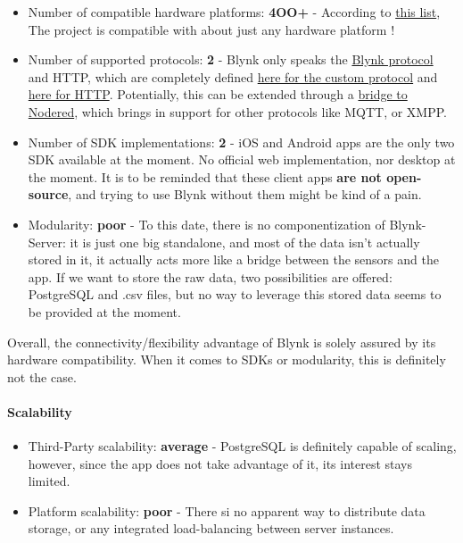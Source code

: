 \documentclass{article}
\begin{document}
\begin{itemize}
\item Number of compatible hardware platforms: \textbf{4OO+} - According to \href{https://github.com/blynkkk/blynkkk.github.io/blob/master/SupportedHardware.md}{this list}, The project is compatible with about just any hardware platform !
\item Number of supported protocols: \textbf{2} - Blynk only speaks the \href{https://github.com/blynkkk/blynk-server#blynk-protocol}{Blynk protocol} and HTTP, which are completely defined \href{https://github.com/blynkkk/blynk-library/blob/master/src/Blynk/BlynkProtocolDefs.h}{here for the custom protocol} and \href{http://docs.blynkapi.apiary.io/#reference/0/qr-for-project-cloning}{here for HTTP}. Potentially, this can be extended through a \href{https://github.com/tzapu/node-red-contrib-blynk-websockets}{bridge to Nodered}, which brings in support for other protocols like MQTT, or XMPP.
\item Number of SDK implementations: \textbf{2} - iOS and Android apps are the only two SDK available at the moment. No official web implementation, nor desktop at the moment. It is to be reminded that these client apps \textbf{are not open-source}, and trying to use Blynk without them might be kind of a pain.
\item Modularity: \textbf{poor} - To this date, there is no componentization of Blynk-Server: it is just one big standalone, and most of the data isn't actually stored in it, it actually acts more like a bridge between the sensors and the app. If we want to store the raw data, two possibilities are offered: PostgreSQL and .csv files, but no way to leverage this stored data seems to be provided at the moment.
\end{itemize}

Overall, the connectivity/flexibility advantage of Blynk is solely assured by its hardware compatibility. When it comes to SDKs or modularity, this is definitely not the case.

\paragraph{Scalability}

\begin{itemize}
\item Third-Party scalability: \textbf{average} - PostgreSQL is definitely capable of scaling, however, since the app does not take advantage of it, its interest stays limited.
\item Platform scalability: \textbf{poor} - There si no apparent way to distribute data storage, or any integrated load-balancing between server instances.
\end{itemize}
\end{document}
